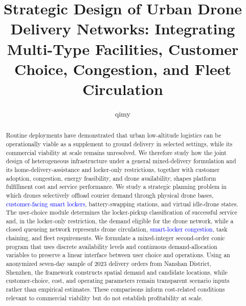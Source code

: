 \documentclass[final,3p,authoryear]{elsarticle}
\begin{document}
\begin{frontmatter}

\title{Strategic Design of Urban Drone Delivery Networks: Integrating Multi-Type Facilities, Customer Choice, Congestion, and Fleet Circulation}
\author{qimy}
\date{}

\begin{abstract}
\color{blue}
Routine deployments have demonstrated that urban low-altitude logistics can be operationally viable as a supplement to ground delivery in selected settings, while its commercial viability at scale remains unresolved.
We therefore study how the joint design of heterogeneous infrastructure under a general mixed-delivery formulation and its home-delivery-assistance and locker-only restrictions, together with customer adoption, congestion, energy feasibility, and drone availability, shapes platform fulfillment cost and service performance.
\color{black}
We study a strategic planning problem in which drones selectively offload courier demand through physical drone bases, \textcolor{blue}{customer-facing smart lockers}, battery-swapping stations, and virtual idle-drone states.
The user-choice module determines the locker-pickup classification of successful service and, in the locker-only restriction, the demand eligible for the drone network, while a closed queueing network represents drone circulation, \textcolor{blue}{smart-locker congestion}, task chaining, and fleet requirements.
We formulate a mixed-integer second-order conic program that uses discrete availability levels and continuous demand-allocation variables to preserve a linear interface between user choice and operations.
\color{blue}
Using an anonymized seven-day sample of 2023 delivery orders from Nanshan District, Shenzhen, the framework constructs spatial demand and candidate locations, while customer-choice, cost, and operating parameters remain transparent scenario inputs rather than empirical estimates.
These comparisons inform cost-related conditions relevant to commercial viability but do not establish profitability at scale.

\end{abstract}
\end{frontmatter}
\end{document}
